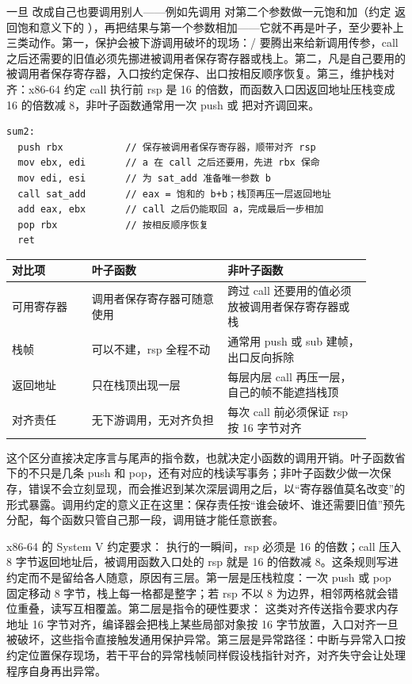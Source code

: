 一旦  改成自己也要调用别人——例如先调用  对第二个参数做一元饱和加（约定  返回饱和意义下的 ），再把结果与第一个参数相加——它就不再是叶子，至少要补上三类动作。第一，保护会被下游调用破坏的现场：/ 要腾出来给新调用传参，call 之后还需要的旧值必须先挪进被调用者保存寄存器或栈上。第二，凡是自己要用的被调用者保存寄存器，入口按约定保存、出口按相反顺序恢复。第三，维护栈对齐：x86-64 约定 call 执行前 rsp 是 16 的倍数，而函数入口因返回地址压栈变成 16 的倍数减 8，非叶子函数通常用一次 push 或  把对齐调回来。

\begin{lstlisting}
sum2:
  push rbx           // 保存被调用者保存寄存器，顺带对齐 rsp
  mov ebx, edi       // a 在 call 之后还要用，先进 rbx 保命
  mov edi, esi       // 为 sat_add 准备唯一参数 b
  call sat_add       // eax = 饱和的 b+b；栈顶再压一层返回地址
  add eax, ebx       // call 之后仍能取回 a，完成最后一步相加
  pop rbx            // 按相反顺序恢复
  ret
\end{lstlisting}

\begin{longtable}{L{0.2\linewidth}L{0.34\linewidth}L{0.36\linewidth}}
\toprule
对比项 & 叶子函数 & 非叶子函数 \\
\midrule
可用寄存器 & 调用者保存寄存器可随意使用 & 跨过 call 还要用的值必须放被调用者保存寄存器或栈 \\\tablerowrule
栈帧 & 可以不建，rsp 全程不动 & 通常用 push 或 sub 建帧，出口反向拆除 \\\tablerowrule
返回地址 & 只在栈顶出现一层 & 每层内层 call 再压一层，自己的帧不能遮挡栈顶 \\\tablerowrule
对齐责任 & 无下游调用，无对齐负担 & 每次 call 前必须保证 rsp 按 16 字节对齐 \\
\bottomrule
\end{longtable}

这个区分直接决定序言与尾声的指令数，也就决定小函数的调用开销。叶子函数省下的不只是几条 push 和 pop，还有对应的栈读写事务；非叶子函数少做一次保存，错误不会立刻显现，而会推迟到某次深层调用之后，以“寄存器值莫名改变”的形式暴露。调用约定的意义正在这里：保存责任按“谁会破坏、谁还需要旧值”预先分配，每个函数只管自己那一段，调用链才能任意嵌套。

x86-64 的 System V 约定要求： 执行的一瞬间，rsp 必须是 16 的倍数；call 压入 8 字节返回地址后，被调用函数入口处的 rsp 就是 16 的倍数减 8。这条规则写进约定而不是留给各人随意，原因有三层。第一层是压栈粒度：一次 push 或 pop 固定移动 8 字节，栈上每一格都是整字；若 rsp 不以 8 为边界，相邻两格就会错位重叠，读写互相覆盖。第二层是指令的硬性要求： 这类对齐传送指令要求内存地址 16 字节对齐，编译器会把栈上某些局部对象按 16 字节放置，入口对齐一旦被破坏，这些指令直接触发通用保护异常。第三层是异常路径：中断与异常入口按约定位置保存现场，若干平台的异常栈帧同样假设栈指针对齐，对齐失守会让处理程序自身再出异常。

